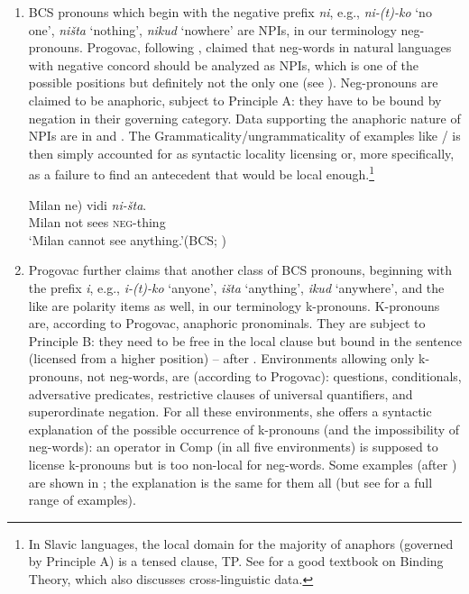 \documentclass[output=paper,colorlinks,citecolor=brown]{langscibook}
\begin{document}
\begin{enumerate}
\item BCS pronouns which begin with the negative prefix \textit{ni}, e.g., \textit{ni-(t)-ko} `no one', \textit{ništa} `nothing', \textit{nikud} `nowhere' are NPIs, in our terminology neg-pronouns. Progovac, following \citet{laka1990negation}, claimed that neg-words in natural languages with negative concord should be analyzed as NPIs, which is one of the possible positions but definitely not the only one (see ). Neg-pronouns are claimed to be anaphoric, subject to Principle A: they have to be bound by negation in their governing category. Data supporting the anaphoric nature of NPIs are in %
and . The Grammaticality/ungrammaticality of examples like / is then simply accounted for as syntactic locality licensing or, more specifically, as a failure to find an antecedent that would be local enough.\footnote{In Slavic languages, the local domain for the majority of anaphors (governed by Principle A) is a tensed clause, TP. See \citet{buring2005binding} for a good textbook on Binding Theory, which also discusses cross-linguistic data.}

  \ea\label{1efb5bed}\gll Milan \minsp{*(} ne) vidi \textit{ni-šta}.\\
  Milan {} not sees \textsc{neg}-thing\\%
  \glt `Milan cannot see anything.'\hfill (BCS; \citealt[41]{progovac1994negative})
  \z

  \z


\item Progovac further claims that another class of BCS pronouns, beginning with the prefix \textit{i}, e.g., \textit{i-(t)-ko} `anyone', \textit{išta} `anything', \textit{ikud} `anywhere', and the like are polarity items as well, in our terminology k-pronouns. K-pronouns are, according to Progovac, anaphoric pronominals. They are subject to Principle B: they need to be free in the local clause but bound in the sentence (licensed from a higher position) -- after \citet[64]{progovac1994negative}. Environments allowing only k-pronouns, not neg-words, are (according to Progovac): questions, conditionals, adversative predicates, restrictive clauses of universal quantifiers, and superordinate negation. For all these environments, she offers a syntactic explanation of the possible occurrence of k-pronouns (and the impossibility of neg-words): an operator in Comp (in all five environments) is supposed to license k-pronouns but is too non-local for neg-words. Some examples (after \citealt{progovac1994negative}) are shown in ; the explanation is the same for them all (but see \cite[64]{progovac1994negative} for a full range of examples).


\end{enumerate}
\end{document}
